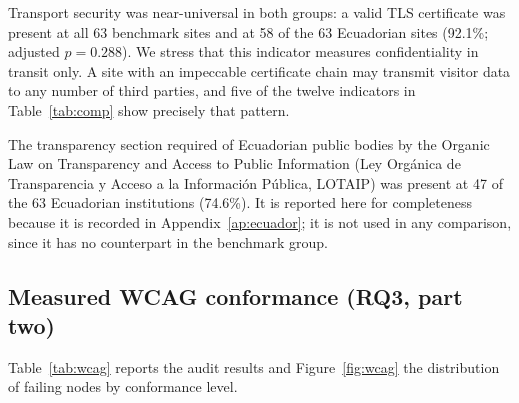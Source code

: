 \documentclass[pdflatex,sn-basic,Numbered,iicol]{sn-jnl}
\theoremstyle{thmstyleone}
\theoremstyle{thmstyletwo}
\theoremstyle{thmstylethree}
\begin{document}
	Transport security was near-universal in both groups: a valid TLS certificate was present at all 63 benchmark sites and at 58 of the 63 Ecuadorian sites (92.1\%; adjusted $p=0.288$). We stress that this indicator measures confidentiality in transit only. A site with an impeccable certificate chain may transmit visitor data to any number of third parties, and five of the twelve indicators in Table~\ref{tab:comp} show precisely that pattern.
	
	The transparency section required of Ecuadorian public bodies by the Organic Law on Transparency and Access to Public Information (Ley Org\'anica de Transparencia y Acceso a la Informaci\'on P\'ublica, LOTAIP) was present at 47 of the 63 Ecuadorian institutions (74.6\%). It is reported here for completeness because it is recorded in Appendix~\ref{ap:ecuador}; it is not used in any comparison, since it has no counterpart in the benchmark group.
	
	\subsection{Measured WCAG conformance (RQ3, part two)}\label{sec:results-wcag}
	
	Table~\ref{tab:wcag} reports the audit results and Figure~\ref{fig:wcag} the distribution of failing nodes by conformance level.
	
\end{document}
